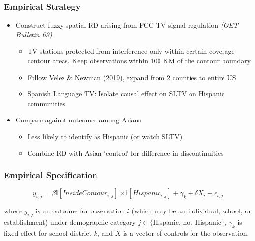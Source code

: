 \documentclass{beamer}
\begin{document}
\begin{frame}
\frametitle{Empirical Strategy}


\begin{itemize}
  \setlength\itemsep{1.5em}
\item Construct fuzzy spatial RD arising from FCC TV signal regulation \textit{(OET Bulletin 69)}
\begin{itemize}
\item TV stations protected from interference only within certain coverage contour areas. Keep observations within 100 KM of the contour boundary
\item Follow Velez \& Newman (2019), expand from 2 counties to entire US
\item Spanish Language TV: Isolate causal effect on SLTV on Hispanic communities
\end{itemize}

\pause
\item Compare against outcomes among Asians
\begin{itemize}
\item Less likely to identify as Hispanic (or watch SLTV)
\item Combine RD with Asian `control' for difference in discontinuities
\end{itemize}

\end{itemize}

\end{frame}

\begin{frame}
\frametitle{Empirical Specification}

\[ y_{i,j} =  \beta \mathbb{I}[InsideContour_{i,j}] \times \mathbb{I}[Hispanic_{i,j}] + \gamma_k + \delta  X_i + \epsilon_{i,j} \]

\vspace{5pt}

where $y_{i,j}$ is an outcome for observation $i$ (which may be an individual, school, or establishment) under demographic category $j \in \{$Hispanic, not Hispanic$\}$, $\gamma_k$ is fixed effect for school district $k$, and $X$ is a vector of controls for the observation. 


\end{frame}
\end{document}
